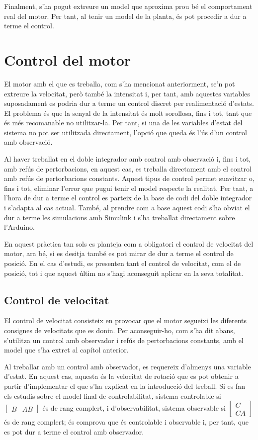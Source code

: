 \documentclass[12pt,a4paper,final,twoside,openright]{report}
\begin{document}
Finalment, s'ha pogut extreure un model que aproxima prou bé el comportament real del motor. Per tant, al tenir un model de la planta, és pot procedir a dur a terme el control.

\chapter{Control del motor}
El motor amb el que es treballa, com s'ha mencionat anteriorment, se'n pot extreure la velocitat, però també la intensitat i, per tant, amb aquestes variables suposadament es podria dur a terme un control discret per realimentació d'estats. El problema és que la senyal de la intensitat és molt sorollosa, fins i tot, tant que és més recomanable no utilitzar-la. Per tant, si una de les variables d'estat del sistema no pot ser utilitzada directament, l'opció que queda és l'ús d'un control amb observació.

Al haver treballat en el doble integrador amb control amb observació i, fins i tot, amb refús de pertorbacions, en aquest cas, es treballa directament amb el control amb refús de pertorbacions constants. Aquest tipus de control permet suavitzar o, fins i tot, eliminar l'error que pugui tenir el model respecte la realitat. Per tant, a l'hora de dur a terme el control es parteix de la base de codi del doble integrador i s'adapta al cas actual. També, al prendre com a base aquest codi s'ha obviat el dur a terme les simulacions amb Simulink i s'ha treballat directament sobre l'Arduino.

En aquest pràctica tan sols es planteja com a obligatori el control de velocitat del motor, ara bé, si es desitja també es pot mirar de dur a terme el control de posició. En el cas d'estudi, es presenten tant el control de velocitat, com el de posició, tot i que aquest últim no s'hagi aconseguit aplicar en la seva totalitat.

\section{Control de velocitat}

El control de velocitat consisteix en provocar que el motor segueixi les diferents consignes de velocitats que es donin. Per aconseguir-ho, com s'ha dit abans, s'utilitza un control amb observador i refús de pertorbacions constants, amb el model que s'ha extret al capítol anterior. 

Al treballar amb un control amb observador, es requereix d'almenys una variable d'estat. En aquest cas, aquesta és la velocitat de rotació que es pot obtenir a partir d'implementar el que s'ha explicat en la introducció del treball. Si es fan els estudis sobre el model final de controlabilitat, sistema controlable si $\begin{bmatrix}B & AB\end{bmatrix}$ és de rang complert, i d'observabilitat, sistema observable si $\begin{bmatrix}C\\CA\end{bmatrix}$ és de rang complert; és comprova que és controlable i observable i, per tant, que es pot dur a terme el control amb observador. 
\end{document}
